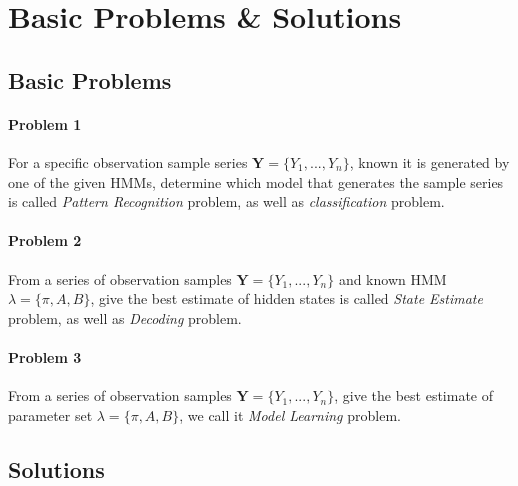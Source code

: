 \documentclass[runningheads]{llncs}
\begin{document}
\section{Basic Problems \& Solutions}
\subsection{Basic Problems}
\paragraph{Problem 1}
For a specific observation sample series $\mathbf{Y} = \{ Y_1, ..., Y_n \} $,
known it is generated by one of the given HMMs, determine which model that generates the 
sample series is called \emph{Pattern Recognition} problem, as well as \emph{classification} problem.
\paragraph{Problem 2}
From a series of observation samples $\mathbf{Y} = \{ Y_1, ..., Y_n \} $ and known HMM
$\lambda = \{ \pi, A, B \} $, give the best estimate of hidden states is called \emph{State Estimate}
problem, as well as \emph{Decoding} problem.
\paragraph{Problem 3}
From a series of observation samples $\mathbf{Y} = \{ Y_1, ..., Y_n \} $,
give the best estimate of parameter set $\lambda = \{ \pi, A, B \} $,
we call it \emph{Model Learning} problem.

\subsection{Solutions}
\end{document}
